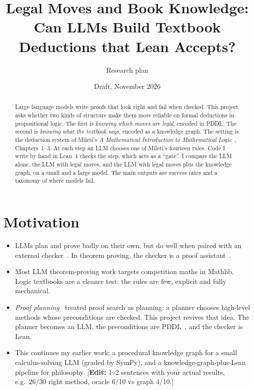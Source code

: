 \documentclass[11pt]{article}
\title{Legal Moves and Book Knowledge:\\
\large Can LLMs Build Textbook Deductions that Lean Accepts?}
\author{Research plan \note{your name}}
\date{Draft, November 2026}
\newcommand{\note}[1]{\textcolor{orange!80!black}{\small[\textbf{Edit:} #1]}}
\begin{document}
\maketitle

\begin{abstract}
\noindent
Large language models write proofs that look right and fail when checked. This project asks whether two kinds of structure make them more reliable on formal deductions in propositional logic. The first is \emph{knowing which moves are legal}, encoded in PDDL. The second is \emph{knowing what the textbook says}, encoded as a knowledge graph. The setting is the deduction system of Mileti's \emph{A Mathematical Introduction to Mathematical Logic}~\cite{mileti2020}, Chapters~1--3. At each step an LLM chooses one of Mileti's fourteen rules. Code I write by hand in Lean~4 checks the step, which acts as a ``gate''. I compare the LLM alone, the LLM with legal moves, and the LLM with legal moves plus the knowledge graph, on a small and a large model. The main outputs are success rates and a taxonomy of where models fail.
\end{abstract}

\section{Motivation}
\begin{itemize}[leftmargin=*]
  \item LLMs plan and prove badly on their own, but do well when paired with an external checker~\cite{kambhampati2024llmmodulo,valmeekam2023planbench}. In theorem proving, the checker is a proof assistant~\cite{yang2023leandojo,thakur2024copra}.
  \item Most LLM theorem-proving work targets competition maths in Mathlib. Logic textbooks are a cleaner test: the rules are few, explicit and fully mechanical.
  \item \emph{Proof planning}~\cite{bundy1988,bundy1996proofplanning} treated proof search as planning: a planner chooses high-level methods whose preconditions are checked. This project revives that idea. The planner becomes an LLM, the preconditions are PDDL~\cite{mcdermott1998pddl}, and the checker is Lean.
  \item This continues my earlier work: a procedural knowledge graph for a small calculus-solving LLM (graded by SymPy), and a knowledge-graph-plus-Lean pipeline for philosophy. \note{1--2 sentences with your actual results, e.g.\ 26/30 right method, oracle 6/10 vs graph 4/10.}
\end{itemize}
\end{document}
